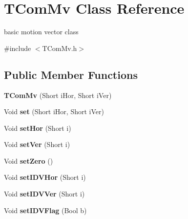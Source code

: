 \hypertarget{class_t_com_mv}{}\section{T\+Com\+Mv Class Reference}
\label{class_t_com_mv}


basic motion vector class  




{\ttfamily \#include $<$T\+Com\+Mv.\+h$>$}

\subsection*{Public Member Functions}
\begin{DoxyCompactItemize}
\item 
\mbox{\label{class_t_com_mv_abae51b903011436e929d15de962efd98}} 
{\bfseries T\+Com\+Mv} (Short i\+Hor, Short i\+Ver)
\item 
\mbox{\label{class_t_com_mv_ae0ea4aaf7ecd175aac6089260d945469}} 
Void {\bfseries set} (Short i\+Hor, Short i\+Ver)
\item 
\mbox{\label{class_t_com_mv_a84a8b1b8e299ab06b52db82798aead4a}} 
Void {\bfseries set\+Hor} (Short i)
\item 
\mbox{\label{class_t_com_mv_a9af740d5c5c04cfc33c54edcec5a3cd4}} 
Void {\bfseries set\+Ver} (Short i)
\item 
\mbox{\label{class_t_com_mv_a1e1eb09f2ced4653d1e4ad2a21179109}} 
Void {\bfseries set\+Zero} ()
\item 
\mbox{\label{class_t_com_mv_af63fbab6a081489073d73bac9941fe9e}} 
Void {\bfseries set\+I\+D\+V\+Hor} (Short i)
\item 
\mbox{\label{class_t_com_mv_adb4da91aecfbde8ddf7260df6d42a478}} 
Void {\bfseries set\+I\+D\+V\+Ver} (Short i)
\item 
\mbox{\label{class_t_com_mv_a519dfe88e97bb1ede8986915e4c0e70e}} 
Void {\bfseries set\+I\+D\+V\+Flag} (Bool b)
\item 
\mbox{\label{class_t_com_mv_ac98674d305d7f4ddbff8c3fd671bc879}} 

\end{DoxyCompactItemize}
